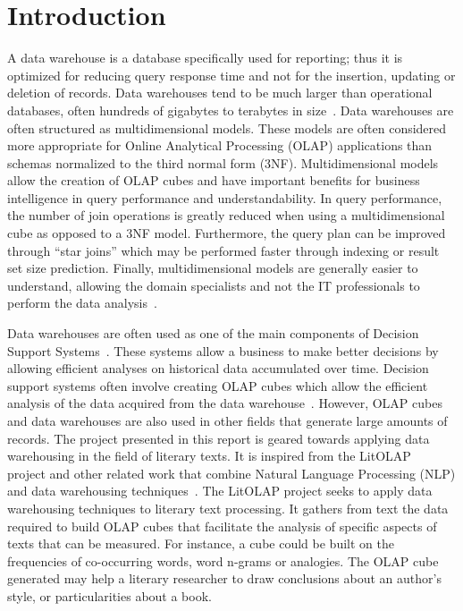 \section{Introduction} %

A data warehouse is a database specifically used for reporting; thus it is optimized for reducing query response time and not for the insertion, updating or
deletion of records. Data warehouses tend to be much larger than operational databases, often hundreds of gigabytes to terabytes in
size~\cite{chau:db-tech-dss}. Data warehouses are often structured as multidimensional models. These models are often considered more appropriate for Online
Analytical Processing (OLAP) applications than schemas normalized to the third normal form (3NF). Multidimensional models allow the creation of OLAP cubes and
have important benefits for business intelligence in query performance and understandability. In query performance, the number of join operations is greatly
reduced when using a multidimensional cube as opposed to a 3NF model. Furthermore, the query plan can be improved through ``star joins'' which may be performed
faster through indexing or result set size prediction. Finally, multidimensional models are generally easier to understand, allowing the domain specialists and
not the IT professionals to perform the data analysis~\cite{KaserKeithLemire2006}.

Data warehouses are often used as one of the main components of Decision Support Systems~\cite{chau:db-tech-dss}. These systems allow a business to make better
decisions by allowing efficient analyses on historical data accumulated over time. Decision support systems often involve creating OLAP cubes which allow the
efficient analysis of the data acquired from the data warehouse~\cite{pede:md-db-tech}. However, OLAP cubes and data warehouses are also used in other fields
that generate large amounts of records. The project presented in this report is geared towards applying data warehousing in the field of literary texts. It is
inspired from the LitOLAP~\cite{KaserKeithLemire2006} project and other related work that combine Natural Language Processing (NLP) and data warehousing
techniques~\cite{inok:OLAP-text-cikm07,text-mining-survey-sigmod07, pere:integratingDW}. The LitOLAP project seeks to apply data warehousing techniques to
literary text processing. It gathers from text the data required to build OLAP cubes that facilitate the analysis of specific aspects of texts that can be
measured. For instance, a cube could be built on the frequencies of co-occurring words, word n-grams or analogies. The OLAP cube generated may help a literary
researcher to draw conclusions about an author’s style, or particularities about a book.

